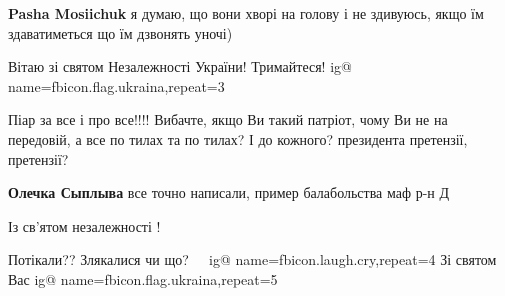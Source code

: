 \begin{itemize}
\begin{itemize}
\textbf{Pasha Mosiichuk} я думаю, що вони хворі на голову і не здивуюсь, якщо їм здаватиметься що їм дзвонять уночі)
\end{itemize}

 
Вітаю зі святом Незалежності України! Тримайтеся! 
\ifcmt
  ig@ name=fbicon.flag.ukraina,repeat=3
\fi


 

Піар за все і про все!!!! Вибачте, якщо Ви такий патріот, чому Ви не на
передовій, а все по тилах та по тилах? І до кожного? президента
претензії, претензії?

\begin{itemize}
 
\textbf{Олечка Сыплыва} все точно написали, пример балабольства маф р-н Д
\end{itemize}

 
Із св'ятом незалежності !

 
Потікали?? Злякалися чи що?🤣🤣🤣🤣 
\ifcmt
  ig@ name=fbicon.laugh.cry,repeat=4
\fi
Зі святом Вас
\ifcmt
  ig@ name=fbicon.flag.ukraina,repeat=5
\fi

 

\end{itemize}
